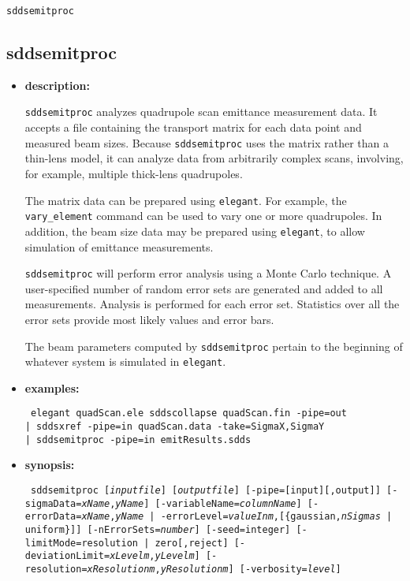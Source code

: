 \documentclass[11pt]{article}
\begin{document}
\newpage
\begin{center}{\Large\verb|sddsemitproc|}\end{center}
\subsection{sddsemitproc}
\label{sddsemitproc}

\begin{itemize}

\item {\bf description:} 

{\tt sddsemitproc} analyzes quadrupole scan emittance measurement
data.  It accepts a file containing the transport matrix for each data
point and measured beam sizes.  Because {\tt sddsemitproc} uses the
matrix rather than a thin-lens model, it can analyze data from
arbitrarily complex scans, involving, for example, multiple thick-lens
quadrupoles.

The matrix data can be prepared using {\tt elegant}.  For example, the
{\tt vary\_element} command can be used to vary one or more
quadrupoles.  In addition, the beam size data may be prepared using
{\tt elegant}, to allow simulation of emittance measurements.

{\tt sddsemitproc} will perform error analysis using a Monte Carlo
technique.  A user-specified number of random error sets are generated
and added to all measurements.  Analysis is performed for each error
set.  Statistics over all the error sets provide most likely values
and error bars.

The beam parameters computed by {\tt sddsemitproc} pertain to the
beginning of whatever system is simulated in {\tt elegant}.

\item {\bf examples:}
\begin{flushleft}{\tt
elegant quadScan.ele
sddscollapse quadScan.fin -pipe=out \\
| sddsxref -pipe=in quadScan.data -take=SigmaX,SigmaY \\
| sddsemitproc -pipe=in emitResults.sdds
}\end{flushleft}

\item {\bf synopsis:}
\begin{flushleft}{\tt
sddsemitproc [{\em inputfile}] [{\em outputfile}] [-pipe=[input][,output]]
 [-sigmaData={\em xName},{\em yName}]
 [-variableName={\em columnName}]
 [-errorData={\em xName},{\em yName} | 
  -errorLevel={\em valueInm},[\{gaussian,{\em nSigmas} | uniform\}]]
 [-nErrorSets={\em number}] [-seed=integer]
 [-limitMode={resolution | zero}[{,reject}]
 [-deviationLimit={\em xLevelm},{\em yLevelm}]
 [-resolution={\em xResolutionm},{\em yResolutionm}]
 [-verbosity={\em level}]
}\end{flushleft}


\end{itemize}
\end{document}
